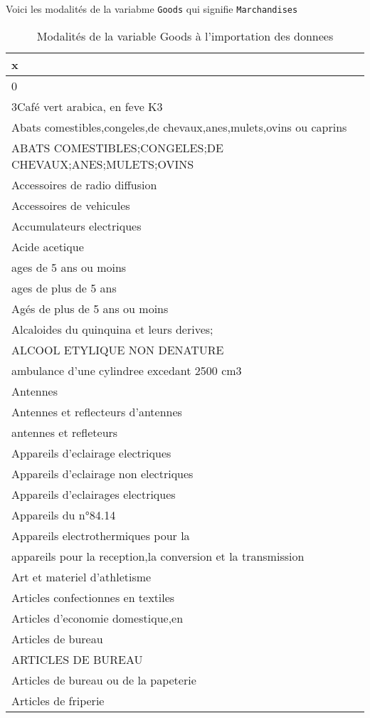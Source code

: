 \documentclass[
]{book}
\begin{document}
Voici les modalités de la variabme \texttt{Goods} qui signifie
\texttt{Marchandises}

\begin{longtable}[t]{l}
\caption{\label{tab:g}Modalités de la variable Goods à l'importation des donnees}\\
\toprule
x\\
\midrule
0\\
3Café vert arabica, en feve K3\\
Abats comestibles,congeles,de chevaux,anes,mulets,ovins ou caprins\\
ABATS COMESTIBLES;CONGELES;DE CHEVAUX;ANES;MULETS;OVINS\\
Accessoires de radio diffusion\\
\addlinespace
Accessoires de vehicules\\
Accumulateurs electriques\\
Acide acetique\\
ages de 5 ans ou moins\\
ages de plus de 5 ans\\
\addlinespace
Agés de plus de 5 ans ou moins\\
Alcaloides du quinquina et leurs derives;\\
ALCOOL ETYLIQUE NON DENATURE\\
ambulance d'une cylindree excedant 2500 cm3\\
Antennes\\
\addlinespace
Antennes et reflecteurs d'antennes\\
antennes et refleteurs\\
Appareils d'eclairage electriques\\
Appareils d'eclairage non electriques\\
Appareils d'eclairages electriques\\
\addlinespace
Appareils du n°84.14\\
Appareils electrothermiques pour la\\
appareils pour la reception,la conversion et la transmission\\
Art et materiel d'athletisme\\
Articles confectionnes en textiles\\
\addlinespace
Articles d'economie domestique,en\\
Articles de bureau\\
ARTICLES DE BUREAU\\
Articles de bureau ou de la papeterie\\
Articles de friperie\\

\end{longtable}
\end{document}
